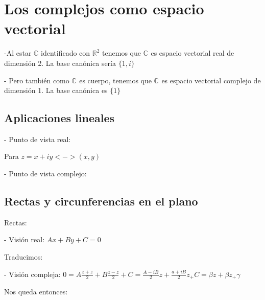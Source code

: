 \section{Los complejos como espacio vectorial}

-Al estar \(\mathbb{C}\) identificado con \(\mathbb{R}^{2}\) tenemos que \(\mathbb{C}^{}\) es espacio vectorial real de dimensión 2.
La base canónica sería \(\{1,i\}\)

- Pero también como \(\mathbb{C}^{}\) es cuerpo, tenemos que \(\mathbb{C}^{}\) es espacio vectorial complejo de dimensión 1.
La base canónica es \(\{1\}\)

\subsection{Aplicaciones lineales}

- Punto de vista real:


Para \(z = x+iy <-> (x,y) \) %


- Punto de vista complejo:


\subsection{Rectas y circunferencias en el plano}

Rectas:

- Visión real: \(Ax + By + C = 0\)

Traducimos:

- Visión compleja: \(0 = A \frac{z+z}{2}+B \frac{z-z}{2} + C = \frac{A-iB}{2}z+\frac{a+iB}{2}z_ + C = \beta z + \beta z_ + \gamma \) 

Nos queda entonces:







